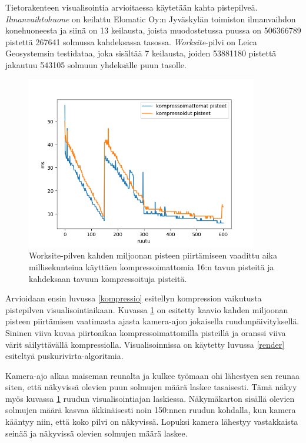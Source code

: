 Tietorakenteen visualisointia arvioitaessa käytetään kahta pistepilveä. \emph{Ilmanvaihtohuone} on keilattu Elomatic Oy:n Jyväskylän toimiston ilmanvaihdon konehuoneesta ja siinä on 13 keilausta, joista muodostetussa puussa on 506366789 pistettä 267641 solmussa kahdeksassa tasossa. \emph{Worksite}-pilvi on Leica Geosystemsin testidataa, joka sisältää 7 keilausta, joiden 53881180 pistettä jakautuu 543105 solmuun yhdeksälle puun tasolle. 

\begin{figure}[h]
    \centering
    \includegraphics[width=0.9\textwidth]{tuloksia/worksite_compressed_vs_uncompressed.png}
    \caption{Worksite-pilven kahden miljoonan pisteen piirtämiseen vaadittu aika millisekunteina käyttäen kompressoimattomia 16:n tavun pisteitä ja kahdeksaan tavuun kompressoituja pisteitä.}
    \label{ws_compr}
\end{figure}

Arvioidaan ensin luvussa \ref{kompressio} esitellyn kompression vaikutusta pistepilven visualisointiaikaan. Kuvassa \ref{ws_compr} on esitetty kaavio kahden miljoonan pisteen piirtämisen vaatimasta ajasta kamera-ajon jokaisella ruudunpäivityksellä. Sininen viiva kuvaa piirtoaikaa kompressoimattomilla pisteillä ja oranssi viiva värit säilyttävällä kompressiolla. Visualisoinnissa on käytetty luvussa \ref{render} esiteltyä puskurivirta-algoritmia. 

Kamera-ajo alkaa maiseman reunalta ja kulkee työmaan ohi lähestyen sen reunaa siten, että näkyvissä olevien puun solmujen määrä laskee tasaisesti. Tämä näkyy myös kuvassa \ref{ws_compr} ruudun visualisointiajan laskiessa. Näkymäkarton sisällä olevien solmujen määrä kasvaa äkkinäisesti noin 150:nnen ruudun kohdalla, kun kamera kääntyy niin, että koko pilvi on näkyvissä. Lopuksi kamera lähestyy vastakkaista seinää ja näkyvissä olevien solmujen määrä laskee. 


